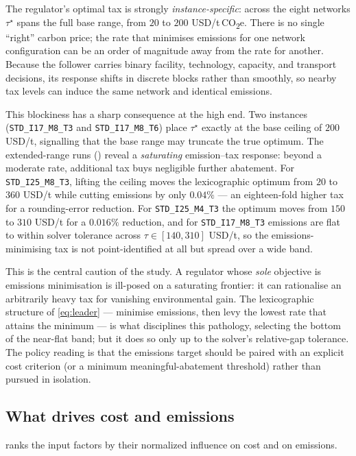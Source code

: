 The regulator's optimal tax is strongly \emph{instance-specific}: across the
eight networks $\tau^{\star}$ spans the full base range, from $20$ to
$200$ USD/t\,CO\textsubscript{2}e. There is no single ``right'' carbon
price; the rate that minimises emissions for one network configuration can
be an order of magnitude away from the rate for another. Because the
follower carries binary facility, technology, capacity, and transport
decisions, its response shifts in discrete blocks rather than smoothly, so
nearby tax levels can induce the same network and identical emissions.

This blockiness has a sharp consequence at the high end. Two instances
(\texttt{STD\_I17\_M8\_T3} and \texttt{STD\_I17\_M8\_T6}) place
$\tau^{\star}$ exactly at the base ceiling of $200$ USD/t, signalling that the
base range may truncate the true optimum. The extended-range runs
() reveal a \emph{saturating} emission--tax response:
beyond a moderate rate, additional tax buys negligible further abatement. For \texttt{STD\_I25\_M8\_T3}, lifting
the ceiling moves the lexicographic optimum from $20$ to $360$ USD/t
while cutting emissions by only $0.04\%$ --- an eighteen-fold higher tax for a
rounding-error reduction. For \texttt{STD\_I25\_M4\_T3} the optimum moves from
$150$ to $310$ USD/t for a $0.016\%$ reduction, and for
\texttt{STD\_I17\_M8\_T3} emissions are flat to within solver tolerance across
$\tau\in[140,310]$ USD/t, so the emissions-minimising tax is not point-identified
at all but spread over a wide band.

This is the central caution of the study. A regulator whose \emph{sole}
objective is emissions minimisation is ill-posed on a saturating frontier: it
can rationalise an arbitrarily heavy tax for vanishing environmental gain.
The lexicographic structure of \eqref{eq:leader} --- minimise emissions, then
levy the lowest rate that attains the minimum --- is what disciplines this
pathology, selecting the bottom of the near-flat band; but it does so only up
to the solver's relative-gap tolerance. The policy reading is that the
emissions target should be paired with an explicit cost criterion (or a
minimum meaningful-abatement threshold) rather than pursued in isolation.

\subsection{What drives cost and emissions}
\label{sec:exp:sensitivity}

 ranks the input factors by their normalized influence
on cost and on emissions.

